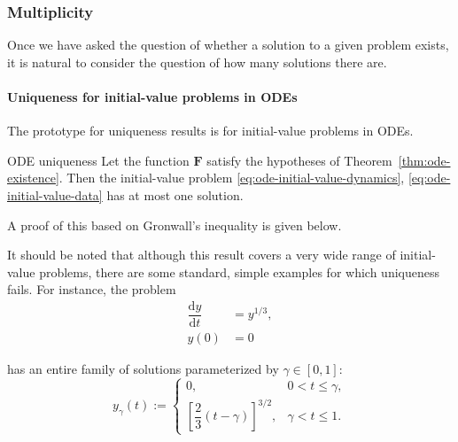 \subsubsection{Multiplicity}\label{subsec:multiplicity}

Once we have asked the question of whether a solution to a given problem exists, it is natural to consider the question of how many solutions there are.

\paragraph*{Uniqueness for initial-value problems in ODEs}

The prototype for uniqueness results is for initial-value problems in ODEs.

\begin{Theorem}{ODE uniqueness}
\label{thm:ode-uniqueness}
Let the function $\bm{F}$ satisfy the hypotheses of Theorem~\ref{thm:ode-existence}. Then the initial-value problem \eqref{eq:ode-initial-value-dynamics}, \eqref{eq:ode-initial-value-data} has at most one solution.
\end{Theorem}

A proof of this based on Gronwall's inequality is given below.

It should be noted that although this result covers a very wide range of initial-value problems, there are some standard, simple examples for which uniqueness fails. For instance, the problem
\[
\begin{aligned}
\dfrac{\mathrm{d}y}{\mathrm{d}t}&=y^{1/3},\\
y(0)&=0
\end{aligned}
\]

has an entire family of solutions parameterized by $\gamma\in[0,1]$:
\[
y_\gamma(t):=\begin{cases}
0,&0<t\leq\gamma,\\
\left[\dfrac{2}{3}(t-\gamma)\right]^{3/2},&\gamma<t\leq1.
\end{cases}
\]
